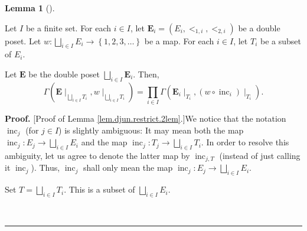 \documentclass[numbers=enddot,12pt,final,onecolumn,notitlepage,abstracton]{scrartcl}
\theoremstyle{definition}
\newtheorem{lem}[theo]{Lemma}
\newenvironment{lemma}[1][]
{\begin{lem}[#1]\begin{leftbar}}
{\end{leftbar}\end{lem}}
\newenvironment{proof}[1][Proof]{\noindent\textbf{#1.} }{\ \rule{0.5em}{0.5em}}
\let\prodnonlimits\prod
\renewcommand{\prod}{\prodnonlimits\limits}
\newenvironment{verlong}{}{}
\begin{document}
\begin{verlong}
\begin{footnotesize}
\begin{lemma}
\label{lem.djun.restrict.2lem}Let $I$ be a finite set. For each $i\in I$, let
$\mathbf{E}_{i}=\left(  E_{i},<_{1,i},<_{2,i}\right)  $ be a double poset.
Let $w:\bigsqcup_{i \in I} E_{i}\rightarrow\left\{  1,2,3,\ldots\right\}  $ be
a map. For each $i\in I$, let $T_{i}$ be a subset of $E_{i}$.

Let $\mathbf{E}$ be the double poset $\bigsqcup_{i\in I}\mathbf{E}_{i}$. Then,%
\[
\Gamma\left(  {\mathbf{E}}\mid_{\bigsqcup_{i\in I}T_{i}},w\mid_{\bigsqcup
_{i\in I}T_{i}}\right)  =\prod_{i\in I}\Gamma\left(  \mathbf{E}_{i}\mid
_{T_{i}},\left(  w\circ\operatorname*{inc}\nolimits_{i}\right)  \mid_{T_{i}%
}\right)  .
\]

\end{lemma}

\begin{proof}
[Proof of Lemma \ref{lem.djun.restrict.2lem}.]We notice that the notation
$\operatorname*{inc}\nolimits_{j}$ (for $j\in I$) is slightly ambiguous: It
may mean both the map $\operatorname*{inc}\nolimits_{j}:E_{j}\rightarrow
\bigsqcup_{i\in I}E_{i}$ and the map $\operatorname*{inc}\nolimits_{j}%
:T_{j}\rightarrow\bigsqcup_{i\in I}T_{i}$. In order to resolve this ambiguity,
let us agree to denote the latter map by $\operatorname*{inc}\nolimits_{j,T}$
(instead of just calling it $\operatorname*{inc}\nolimits_{j}$). Thus,
$\operatorname*{inc}\nolimits_{j}$ shall only mean the map
$\operatorname*{inc}\nolimits_{j}:E_{j}\rightarrow\bigsqcup_{i\in I}E_{i}$.

Set $T=\bigsqcup_{i\in I}T_{i}$. This is a subset of $\bigsqcup_{i\in I} E_i$.


\end{proof}
\end{footnotesize}
\end{verlong}
\end{document}
